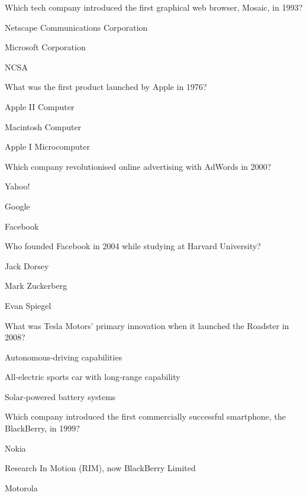 \begin{enhancedmcq}{Which tech company introduced the first graphical web browser, Mosaic, in 1993?}
\item Netscape Communications Corporation
\item Microsoft Corporation
\item NCSA

\end{enhancedmcq}
\begin{enhancedmcq}{What was the first product launched by Apple in 1976?}
\item Apple II Computer
\item Macintosh Computer
\item Apple I Microcomputer

\end{enhancedmcq}
\begin{enhancedmcq}{Which company revolutionised online advertising with AdWords in 2000?}
\item Yahoo!
\item Google
\item Facebook

\end{enhancedmcq}
\begin{enhancedmcq}{Who founded Facebook in 2004 while studying at Harvard University?}
\item Jack Dorsey
\item Mark Zuckerberg
\item Evan Spiegel

\end{enhancedmcq}
\begin{enhancedmcq}{What was Tesla Motors' primary innovation when it launched the Roadster in 2008?}
\item Autonomous‑driving capabilities
\item All‑electric sports car with long‑range capability
\item Solar‑powered battery systems

\end{enhancedmcq}
\begin{enhancedmcq}{Which company introduced the first commercially successful smartphone, the BlackBerry, in 1999?}
\item Nokia
\item Research In Motion (RIM), now BlackBerry Limited
\item Motorola

\end{enhancedmcq}
